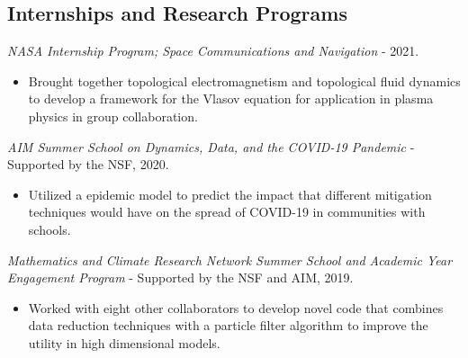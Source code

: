 \documentclass[12pt]{article} %
\begin{document}
\subsection{Internships and Research Programs}
\begin{flushleft}
    \emph{NASA Internship Program; Space Communications and Navigation} - 2021.
\begin{itemize}
	\item Brought together topological electromagnetism and topological fluid dynamics to develop a framework for the Vlasov equation for application in plasma physics in group collaboration.
\end{itemize}
\vspace*{5pt}
    \emph{AIM Summer School on Dynamics, Data, and the COVID-19 Pandemic} - Supported by the NSF, 2020.
\begin{itemize}
	\item Utilized a epidemic model to predict the impact that different mitigation techniques would have on the spread of COVID-19 in communities with schools.
\end{itemize}
\vspace*{5pt}
    \emph{Mathematics and Climate Research Network Summer School and Academic Year Engagement Program} - Supported by the NSF and AIM, 2019.
\begin{itemize}
	\item Worked with eight other collaborators to develop novel code that combines data reduction techniques with a particle filter algorithm to improve the utility in high dimensional models.
\end{itemize}
\end{flushleft}
\end{document}

